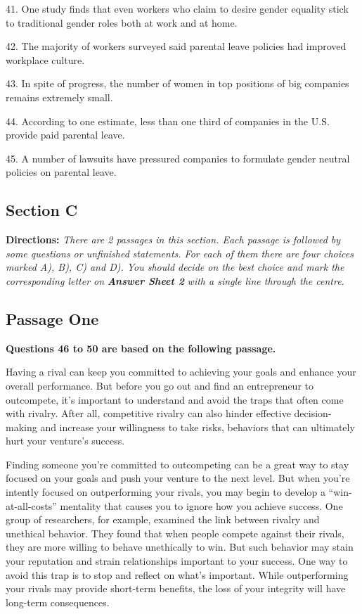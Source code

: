 \documentclass[UTF8,11pt]{ctexart}
\begin{document}
41. One study finds that even workers who claim to desire gender equality stick to traditional gender roles both at work and at home.


42. The majority of workers surveyed said parental leave policies had improved workplace culture.


43. In spite of progress, the number of women in top positions of big companies remains extremely small.


44. According to one estimate, less than one third of companies in the U.S. provide paid parental leave.


45. A number of lawsuits have pressured companies to formulate gender neutral policies on parental leave.


\subsection*{\textbf{Section C}}


\textbf{Directions: }\textit{There are 2 passages in this section. Each passage is followed by some questions or unfinished} \textit{statements. For each of them there are four choices marked A), B), C) and D). You should decide on the best} \textit{choice and mark the corresponding letter on }\textbf{\textit{Answer Sheet 2}}\textit{ with a single line through the centre.}


\subsection*{\textbf{Passage One}}


\textbf{Questions 46 to 50 are based on the following passage.}


Having a rival can keep you committed to achieving your goals and enhance your overall performance. But before you go out and find an entrepreneur to outcompete, it’s important to understand and avoid the traps that often come with rivalry. After all, competitive rivalry can also hinder effective decision-making and increase your willingness to take risks, behaviors that can ultimately hurt your venture’s success.


Finding someone you’re committed to outcompeting can be a great way to stay focused on your goals and push your venture to the next level. But when you’re intently focused on outperforming your rivals, you may begin to develop a “win-at-all-costs” mentality that causes you to ignore how you achieve success. One group of researchers, for example, examined the link between rivalry and unethical behavior. They found that when people compete against their rivals, they are more willing to behave unethically to win. But such behavior may stain your reputation and strain relationships important to your success. One way to avoid this trap is to stop and reflect on what’s important. While outperforming your rivals may provide short-term benefits, the loss of your integrity will have long-term consequences.
\end{document}
